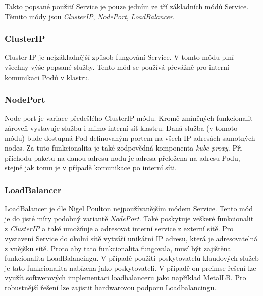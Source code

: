 Takto popsané použití Service je pouze jedním ze tří základních módů Service. Těmito módy jsou \textit{ClusterIP}, \textit{NodePort}, \textit{LoadBalancer}.\cite{poulton_2022_the}%

\subsubsection{ClusterIP}
Cluster IP je nejzákladnější způsob fungování Service. V tomto módu plní všechny výše popsané služby. Tento mód se používá převážně pro interní komunikaci Podů v klastru.\cite{thekubernetesauthors_2023_service}
\subsubsection{NodePort}
Node port je variace předešlého ClusterIP módu. Kromě zmíněných funkcionalit zároveň vystavuje službu i mimo interní síť klastru. Daná služba (v tomoto módu) bude dostupná Pod definovaným portem na všech IP adresách samotných nodes. Za tuto funkcionalita je také zodpovědná komponenta \textit{kube-proxy}. Při příchodu paketu na danou adresu nodu je adresa přeložena na adresu Podu, stejně jak tomu je v případě komunikace po interní síti.\cite{thekubernetesauthors_2023_service}   
\subsubsection{LoadBalancer}
LoadBalancer je dle Nigel Poulton\cite{poulton_2022_the} nejpoužívanějším módem Service. Tento mód je do jisté míry podobný variantě \textit{NodePort}. Také poskytuje veškeré funkcionalit z \textit{ClusterIP} a také umožňuje a adresovat interní service z externí sítě. Pro vystavení Service do okolní sítě vytváří unikátní IP adresu, která je adresovatelná z vnějšku sítě. Proto aby tato funkcionalita fungovala, musí být zajištěna funkcionalita LoadBalancingu. V případě použití poskytovatelů klaudových služeb je tato funkcionalita nabízena jako poskytovateli. V případě on-preimse řešení lze využít softwerových implementaci loadbalanceru jako například MetalLB. Pro robustnější řešení lze zajistit hardwarovou podporu Loadbalancingu.\cite{thekubernetesauthors_2023_service}


